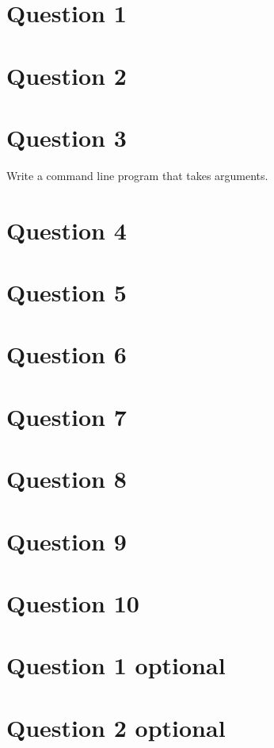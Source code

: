 \documentclass[12pt,letterpaper]{article}
\begin{document}
\section{Question 1}
\section{Question 2}
\section{Question 3}
Write a command line program that takes arguments.\\
\section{Question 4}
\section{Question 5}
\section{Question 6}
\section{Question 7}
\section{Question 8}
\section{Question 9}
\section{Question 10}
\section{Question 1 optional}
\section{Question 2 optional}
\end{document}
